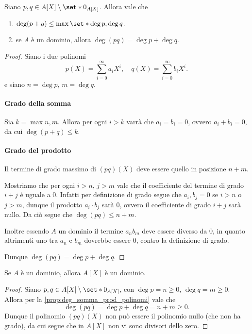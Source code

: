 \begin{proposition}
    \label{prop:deg_somma_prod_polinomi}
    Siano $p, q \in A[X] \setminus \set*{0_{A[X]}}$. Allora vale che \begin{enumerate}[label={(\roman*)}]
        \item $\deg (p + q) \leq \max \set*{\deg p, \deg q}$.
        \item se $A$ è un dominio, allora $\deg (pq) = \deg p + \deg q$.
    \end{enumerate}
\end{proposition}
\begin{proof}
    Siano i due polinomi \[
        p(X) = \sum_{i = 0}^\infty a_iX^i, \quad q(X) = \sum_{i = 0}^\infty b_iX^i.   
    \] e siano $n = \deg p$, $m = \deg q$.

    \paragraph{Grado della somma} Sia $k = \max {n, m}$. Allora per ogni $i > k$ varrà che $a_i = b_i = 0$, ovvero $a_i + b_i = 0$, da cui $\deg (p + q) \leq k$.

    \paragraph{Grado del prodotto} Il termine di grado massimo di $(pq)(X)$ deve essere quello in posizione $n + m$. 
    
    Mostriamo che per ogni $i > n$, $j > m$ vale che il coefficiente del termine di grado $i + j$ è uguale a $0$.
    Infatti per definizione di grado segue che $a_i, b_j = 0$ se $i > n$ o $j > m$, dunque il prodotto $a_i \cdot b_j$ sarà $0$, ovvero il coefficiente di grado $i + j$ sarà nullo. Da ciò segue che $\deg (pq) \leq n + m$.

    Inoltre essendo $A$ un dominio il termine $a_nb_m$ deve essere diverso da $0$, in quanto altrimenti uno tra $a_n$ e $b_m$ dovrebbe essere $0$, contro la definizione di grado.

    Dunque $\deg (pq) = \deg p + \deg q$.
\end{proof}

\begin{corollary}
    Se $A$ è un dominio, allora $A[X]$ è un dominio.
\end{corollary}
\begin{proof}
    Siano $p, q \in A[X] \setminus \set*{0_{A[X]}}$, con $\deg p = n \geq 0$, $\deg q = m \geq 0$. Allora per la \autoref{prop:deg_somma_prod_polinomi} vale che \[
        \deg (pq) = \deg p + \deg q = n + m \geq 0.    
    \] Dunque il polinomio $(pq)(X)$ non può essere il polinomio nullo (che non ha grado), da cui segue che in $A[X]$ non vi sono divisori dello zero.
\end{proof}


